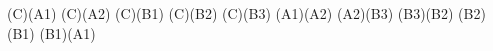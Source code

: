	
	\Edge(C)(A1)
	\Edge(C)(A2)
	\Edge(C)(B1)
	\Edge(C)(B2)
	\Edge(C)(B3)
	\Edge(A1)(A2)
	\Edge(A2)(B3)
	\Edge(B3)(B2)
	\Edge(B2)(B1)
	\Edge(B1)(A1)
